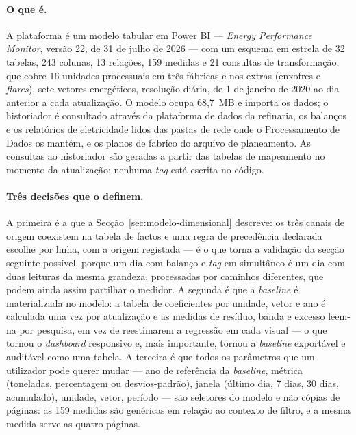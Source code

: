 \paragraph{O que é.} A plataforma é um modelo tabular em Power BI ---
\emph{Energy Performance Monitor}, versão 22, de 31 de julho de 2026 ---
com um esquema em estrela de 32 tabelas, 243 colunas, 13 relações, 159
medidas e 21 consultas de transformação, que cobre 16 unidades processuais
em três fábricas e nos extras (enxofres e \emph{flares}), sete vetores
energéticos, resolução diária, de 1 de janeiro de 2020 ao dia anterior a
cada atualização. O modelo ocupa 68,7~MB e importa os dados; o historiador
é consultado através da plataforma de dados da refinaria, os balanços e os
relatórios de eletricidade lidos das pastas de rede onde o Processamento de
Dados os mantém, e os planos de fabrico do arquivo de planeamento. As
consultas ao historiador são geradas a partir das tabelas de mapeamento
no momento da atualização; nenhuma \emph{tag} está escrita no código.

\paragraph{Três decisões que o definem.} A primeira é a que a
Secção~\ref{sec:modelo-dimensional} descreve: os três canais de origem
coexistem na tabela de factos e uma regra de precedência declarada escolhe
por linha, com a origem registada --- é o que torna a validação da secção
seguinte possível, porque um dia com balanço e \emph{tag} em simultâneo é
um dia com duas leituras da mesma grandeza, processadas por caminhos
diferentes, que podem ainda assim partilhar o medidor. A segunda é que a
\emph{baseline} é materializada no modelo: a tabela de coeficientes por
unidade, vetor e ano é calculada uma vez por atualização e as medidas de
resíduo, banda e excesso leem-na por pesquisa, em vez de reestimarem a
regressão em cada visual --- o que tornou o \emph{dashboard} responsivo e,
mais importante, tornou a \emph{baseline} exportável e auditável como uma
tabela. A terceira é que todos os parâmetros que um utilizador pode querer
mudar --- ano de referência da \emph{baseline}, métrica (toneladas,
percentagem ou desvios-padrão), janela (último dia, 7 dias, 30 dias,
acumulado), unidade, vetor, período --- são seletores do modelo e não
cópias de páginas: as 159 medidas são genéricas em relação ao contexto de
filtro, e a mesma medida serve as quatro páginas.

